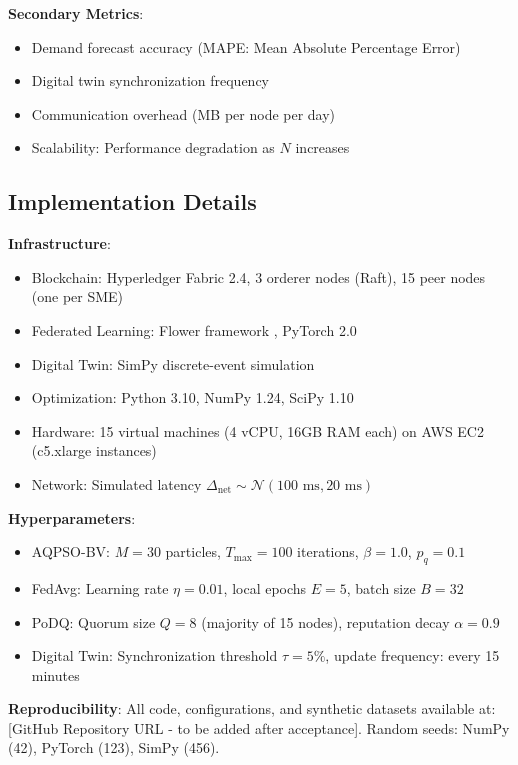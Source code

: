 \documentclass[times,10pt,twocolumn]{jucs2e}
\begin{document}
\textbf{Secondary Metrics}:
\begin{itemize}
\item Demand forecast accuracy (MAPE: Mean Absolute Percentage Error)
\item Digital twin synchronization frequency
\item Communication overhead (MB per node per day)
\item Scalability: Performance degradation as $N$ increases
\end{itemize}

\subsection{Implementation Details}

\textbf{Infrastructure}:
\begin{itemize}
\item Blockchain: Hyperledger Fabric 2.4, 3 orderer nodes (Raft), 15 peer nodes (one per SME)
\item Federated Learning: Flower framework \cite{Beutel2020}, PyTorch 2.0
\item Digital Twin: SimPy discrete-event simulation \cite{Matloff2008}
\item Optimization: Python 3.10, NumPy 1.24, SciPy 1.10
\item Hardware: 15 virtual machines (4 vCPU, 16GB RAM each) on AWS EC2 (c5.xlarge instances)
\item Network: Simulated latency $\Delta_{\text{net}} \sim \mathcal{N}(100 \text{ ms}, 20 \text{ ms})$
\end{itemize}

\textbf{Hyperparameters}:
\begin{itemize}
\item AQPSO-BV: $M = 30$ particles, $T_{\max} = 100$ iterations, $\beta = 1.0$, $p_q = 0.1$
\item FedAvg: Learning rate $\eta = 0.01$, local epochs $E = 5$, batch size $B = 32$
\item PoDQ: Quorum size $Q = 8$ (majority of 15 nodes), reputation decay $\alpha = 0.9$
\item Digital Twin: Synchronization threshold $\tau = 5\%$, update frequency: every 15 minutes
\end{itemize}

\textbf{Reproducibility}: All code, configurations, and synthetic datasets available at: [GitHub Repository URL - to be added after acceptance]. Random seeds: NumPy (42), PyTorch (123), SimPy (456).
\end{document}
